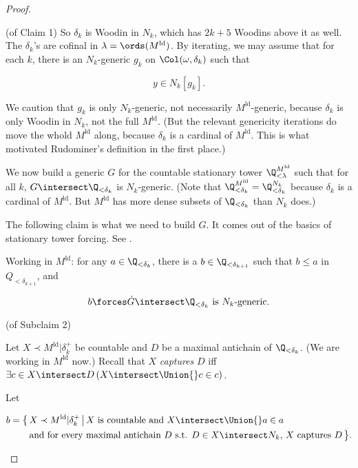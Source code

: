 \documentclass[oneside,12pt]{amsart}
\begin{document}
\begin{proof}
\begin{subproof}{(of Claim 1)}
So $\delta_k$ is Woodin in $N_k$, which has $2k+5$ Woodins above it as well. The
$\delta_k$'s are cofinal in $\lambda=\ords(M^{\text{ld}})$. By iterating,
we may assume that for each $k$, there is an $N_k$-generic $g_k$ on
$\Col(\omega,\delta_k)$ such that

$$
y\in N_k[g_k].
$$

We caution that $g_k$ is only $N_k$-generic, not necessarily $M^{\text{ld}}$-generic,
because $\delta_k$ is only Woodin in $N_k$, not the full $M^{\text{ld}}$.
(But the relevant genericity iterations do move the whold $M^{\text{ld}}$ along,
because $\delta_k$ is a cardinal of $M^{\text{ld}}$. This is what motivated
Rudominer's definition in the first place.)

We now build a generic $G$ for the countable stationary tower $\Q^{M^{\text{ld}}}_{<\lambda}$
such that for all $k$, $G\intersect \Q_{<\delta_k}$ is $N_k$-generic. (Note that
$\Q^{M^{\text{ld}}}_{<\delta_k}=\Q^{N_k}_{<\delta_k}$ because $\delta_k$ is
a cardinal of $M^{\text{ld}}$. But $M^{\text{ld}}$ has more dense subsets of $\Q_{<\delta_k}$
than $N_k$ does.)

The following claim is what we need to build $G$. It comes out of the basics of stationary tower forcing.
See \cite{Larson_Book}.

\begin{claim}[Subclaim 2]
Working in $M^{\text{ld}}$: for any $a\in\Q_{<\delta_k}$, there is a $b\in\Q_{<\delta_{k+1}}$
such that $b\leq a$ in $Q_{<\delta_{k+1}}$, and

$$
b\forces \dot{G} \intersect \Q_{<\delta_k} \text{ is } N_k\text{-generic}.
$$

\end{claim}

\begin{subproof}{(of Subclaim 2)}

Let $X\prec M^{\text{ld}} | \delta_k^+$ be countable and $D$ be a maximal antichain of $\Q_{<\delta_k}$.
(We are working in $M^{\text{ld}}$ now.) Recall that $X$ \emph{captures} $D$ iff
$\exists c \in X\intersect D \left (X\intersect \Union{}c \in c  \right)$.

Let

\begin{align*}
b = \big\{ \, &X\prec M^{\text{ld}} | \delta_k^+ \, \big| \, X \text{ is countable and } X\intersect \Union{}a \in a \\
              &\text{and for every maximal antichain $D$ s.t. $D\in X\intersect N_k$, $X$ captures } D \, \big\}.
\end{align*}


\end{subproof}
\end{subproof}
\end{proof}
\end{document}
